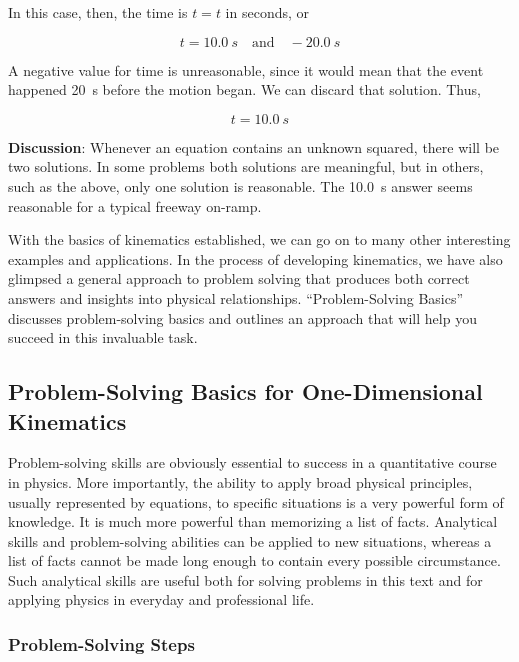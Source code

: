 \documentclass[../../main-ap-physics.tex]{subfiles}
\begin{document}
In this case, then, the time is $t = t$ in seconds, or

\begin{equation*}
     t = \SI{10.0}{s} \quad \text{and} \quad -\SI{20.0}{s}
\end{equation*}

A negative value for time is unreasonable, since it would mean that the event happened \SI{20}{s} before the motion began. We can discard that solution. Thus,

\begin{equation*}
    t = \SI{10.0}{s}
\end{equation*}

\textbf{Discussion}: Whenever an equation contains an unknown squared, there will be two solutions. In some problems both solutions are meaningful, but in others, such as the above, only one solution is reasonable. The \SI{10.0}{s} answer seems reasonable for a typical freeway on-ramp.

\endsolution

\vspace{1em}

With the basics of kinematics established, we can go on to many other interesting examples and applications. In the process of developing kinematics, we have also glimpsed a general approach to problem solving that produces both correct answers and insights into physical relationships. ``Problem-Solving Basics'' discusses problem-solving basics and outlines an approach that will help you succeed in this invaluable task.

\subsection{Problem-Solving Basics for One-Dimensional Kinematics}

Problem-solving skills are obviously essential to success in a quantitative course in physics. More importantly, the ability to apply broad physical principles, usually represented by equations, to specific situations is a very powerful form of knowledge. It is much more powerful than memorizing a list of facts. Analytical skills and problem-solving abilities can be applied to new situations, whereas a list of facts cannot be made long enough to contain every possible circumstance. Such analytical skills are useful both for solving problems in this text and for applying physics in everyday and professional life.

\subsubsection*{Problem-Solving Steps}
\end{document}
